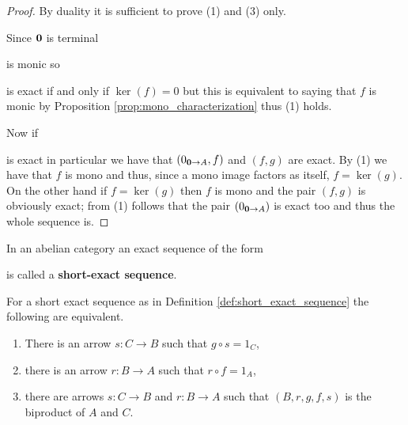 \begin{proof}
  By duality it is sufficient to prove (1) and (3) only.

  Since \({\bf 0}\) is terminal  is monic so  is exact if and only if \(\ker(f) = 0\) but this is equivalent to saying that \(f\) is monic by Proposition \ref{prop:mono_characterization} thus (1) holds.

  Now if  is exact in particular we have that \((0_{{\bf 0}\to A}, f)\) and \((f, g)\) are exact. By (1) we have that \(f\) is mono and thus, since a mono image factors as itself, \(f = \ker(g)\). On the other hand if \(f = \ker(g)\) then \(f\) is mono and the pair \((f, g)\) is obviously exact; from (1) follows that the pair \((0_{{\bf 0}\to A})\) is exact too and thus the whole sequence is.
\end{proof}

\begin{definition}
  \label{def:short_exact_sequence}
  In an abelian category an exact sequence of the form  is called a {\bf short-exact sequence}.
\end{definition}

\begin{proposition}
  \label{prop:short_exact_sequences_equivalences}
  For a short exact sequence as in Definition \ref{def:short_exact_sequence} the following are equivalent.
  \begin{enumerate}[label=(\arabic*)]
  \item There is an arrow \(s\colon C\to B\) such that \(g\circ s = 1_C\),
  \item there is an arrow \(r\colon B\to A\) such that \(r\circ f = 1_A\),
  \item there are arrows \(s\colon C\to B\) and \(r\colon B\to A\) such that \((B, r, g, f, s)\) is the biproduct of \(A\) and \(C\).
  \end{enumerate}
\end{proposition}

